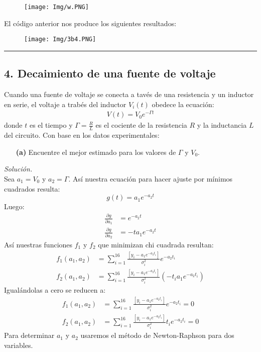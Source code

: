\documentclass[11pt]{article}
\begin{document}
\begin{figure}[h]
	\centering
	\texttt{[image: Img/w.PNG]}
\end{figure}

El código anterior nos produce los siguientes resultados:
\begin{figure}[h]
	\centering
	\texttt{[image: Img/3b4.PNG]}
\end{figure}
\hrule
	\newpage

\subsection*{\textbf{4. Decaimiento de una fuente de voltaje}}

Cuando una fuente de voltaje se conecta a tavés de una resistencia y un inductor en serie, el voltaje a trabés del inductor $V_i(t)$ obedece la ecuación:
\begin{align}
	V(t) = V_0 e^{-\Gamma t}	\label{voltaje}
\end{align}
donde $t$ es el tiempo y $\Gamma = \frac{R}{L}$ es el cociente de la resistencia $R$ y la inductancia $L$ del circuito. Con base en los datos experimentales:
\begin{enumerate}
	\item [\textbf{(a)}] Encuentre el mejor estimado para los valores de $\Gamma$ y $V_0$.
\end{enumerate}
\textit{Solución.}\\
	Sea $a_1 = V_0$ y $a_2 = \Gamma$. Así nuestra ecuación para hacer ajuste por mínimos cuadrados resulta:
	\begin{equation}
		g(t) = a_1 e^{-a_2 t}	\label{hh}
	\end{equation}
	Luego:
	\begin{align*}
		\frac{\partial g}{\partial a_1} & = e^{-a_2 t}	\\
		 \frac{\partial g}{\partial a_2} & = -t a_1 e^{-a_2 t}
	\end{align*}
	Así nuestras funciones $f_1$ y $f_2$ que minimizan chi cuadrada resultan:
	\begin{align*}
		f_1 (a_1,a_2) &= \sum_{i=1}^{16} \frac{[y_i - a_1 e^{-a_2 t_i}]}{\sigma_i^2} e^{-a_2 t_i}	\\
		f_2 (a_1,a_2) &= \sum_{i=1}^{16} \frac{[y_i - a_1 e^{-a_2 t_i}]}{\sigma_i^2} (-t_i a_1 e^{-a_2 t_i})	
	\end{align*}
	Igualándolas a cero se reducen a:
	\begin{align}
		f_1 (a_1,a_2) &= \sum_{i=1}^{16} \frac{[y_i - a_1 e^{-a_2 t_i}]}{\sigma_i^2} e^{-a_2 t_i}	 = 0 \label{oo}\\ 
		f_2 (a_1,a_2) &= \sum_{i=1}^{16} \frac{[y_i - a_1 e^{-a_2 t_i}]}{\sigma_i^2} t_i  e^{-a_2 t_i} = 0 	\label{jj}	
	\end{align}	
	Para determinar $a_1$ y $a_2$ usaremos el método de Newton-Raphson para dos variables.
	
\end{document}
